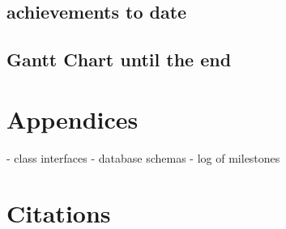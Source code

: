 \documentclass{article}
\begin{document}
\subsection{achievements to date}

\subsection{Gantt Chart until the end}

\section{Appendices}
- class interfaces
- database schemas
- log of milestones

\section{Citations}

\newpage
\end{document}
